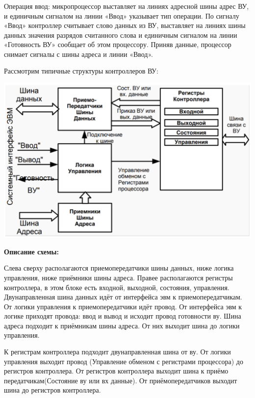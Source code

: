 \documentclass{article}
\begin{document}
Операция ввод: микропроцессор выставляет на линиях адресной шины адрес ВУ, и единичным сигналом на линии «Ввод» указывает тип операции. 
По сигналу «Ввод» контроллер считывает слово данных из ВУ, выставляет на линиях шины данных значения разрядов считанного слова и единичным сигналом на линии
«Готовность ВУ» сообщает об этом процессору. Приняв данные, процессор снимает сигналы с шины адреса и линии «Ввод».


Рассмотрим типичные структуры контроллеров ВУ:

\includegraphics[width=.8\textwidth]{kontr-bu.png}

\textbf{Описание схемы:}

Слева сверху располагаются приемопередатчики шины данных, ниже логика управления, ниже приёмники шины адреса. Правее располагаются регистры контроллера, в этом блоке есть входной, выходной, состояния, управления. 
Двунаправленная шина данных идёт от интерфейса эвм к приемопередатчикам. От логики управления к приемопередатчики идёт провод. От интерфейса эвм к логике приходят провода: ввод и вывод и исходит провод готовности ву. 
Шина адреса подходит к приёмникам шины адреса. От них выходит шина до логики управления.

К регистрам контроллера подходит двунаправленная шина от ву. От логики управления выходит провод (Управление обменом с регистрами процессора) до регистров контроллера. От регистров контроллера выходит шина к приёмо передатчикам(Состояние ву или вх данные). От приёмопередатчиков выходит шина до регистров контроллера.
\end{document}
